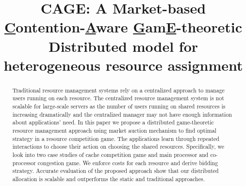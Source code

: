 \documentclass{sig-alternate}
\title{CAGE: A Market-based \underline{C}ontention-\underline{A}ware \underline{G}am\underline{E}-theoretic Distributed model for heterogeneous resource assignment}
\begin{document}
\maketitle
{}
\thispagestyle{plain}
\pagestyle{plain}




\begin{abstract}
\noindent Traditional resource management systems rely on a centralized approach to manage users running on each resource. The centralized resource management system is not scalable for large-scale servers as the number of users running on shared resources is increasing dramatically and the centralized manager may not have enough information about applications' need. In this paper we propose a distributed game-theoretic resource management approach using market auction mechanism to find optimal strategy in a resource competition game. The applications learn through repeated interactions to choose their action on choosing the shared resources. Specifically, we look into two case studies of cache competition game and main processor and co-processor congestion game. We enforce costs for each resource and derive bidding strategy. Accurate evaluation of the proposed approach show that our distributed allocation is scalable and outperforms the static and traditional approaches.
\end{abstract}








%
%
 

\end{document}
